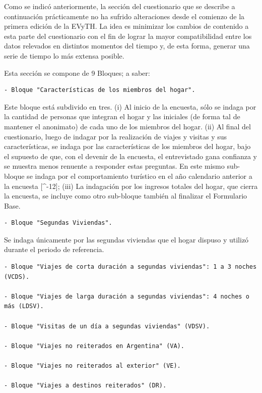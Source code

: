 \documentclass[
  openany]{book}
\begin{document}
Como se indicó anteriormente, la sección del cuestionario que se describe a continuación prácticamente no ha sufrido alteraciones desde el comienzo de la primera edición de la EVyTH.
La idea es minimizar los cambios de contenido a esta parte del cuestionario con el fin de lograr la mayor compatibilidad entre los datos relevados en distintos momentos del tiempo y, de esta forma, generar una serie de tiempo lo más extensa posible.

Esta sección se compone de 9 Bloques; a saber:

\begin{verbatim}
- Bloque "Características de los miembros del hogar".
\end{verbatim}

Este bloque está subdivido en tres.
(i) Al inicio de la encuesta, sólo se indaga por la cantidad de personas que integran el hogar y las iniciales (de forma tal de mantener el anonimato) de cada uno de los miembros del hogar.
(ii) Al final del cuestionario, luego de indagar por la realización de viajes y visitas y sus características, se indaga por las características de los miembros del hogar, bajo el supuesto de que, con el devenir de la encuesta, el entrevistado gana confianza y se muestra menos renuente a responder estas preguntas.
En este mismo sub-bloque se indaga por el comportamiento turístico en el año calendario anterior a la encuesta {[}\^{}-12{]}; (iii) La indagación por los ingresos totales del hogar, que cierra la encuesta, se incluye como otro sub-bloque también al finalizar el Formulario Base.

\begin{verbatim}
- Bloque "Segundas Viviendas".
\end{verbatim}

Se indaga únicamente por las segundas viviendas que el hogar dispuso y utilizó durante el periodo de referencia.

\begin{verbatim}
- Bloque "Viajes de corta duración a segundas viviendas": 1 a 3 noches (VCDS).

- Bloque "Viajes de larga duración a segundas viviendas": 4 noches o más (LDSV).

- Bloque "Visitas de un día a segundas viviendas" (VDSV).

- Bloque "Viajes no reiterados en Argentina" (VA).

- Bloque "Viajes no reiterados al exterior" (VE).

- Bloque "Viajes a destinos reiterados" (DR).
\end{verbatim}
\end{document}
